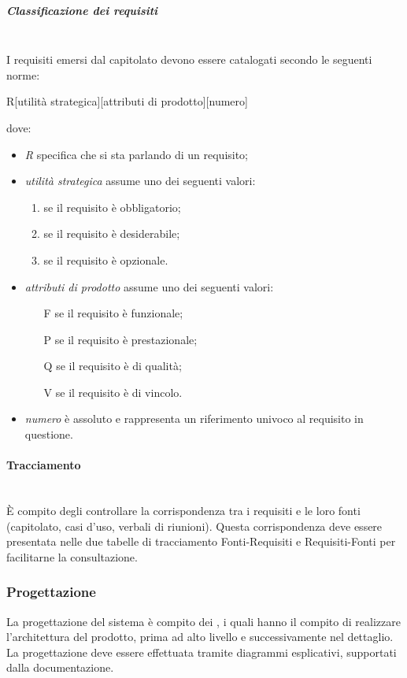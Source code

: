 \subparagraph{Classificazione dei requisiti}\mbox{}\\
I requisiti emersi dal capitolato devono essere catalogati secondo le seguenti norme:
\begin{center}
	R[utilità strategica][attributi di prodotto][numero]
\end{center}
dove:
\begin{itemize}
	\item \textit{R} specifica che si sta parlando di un requisito;
	\item \textit{utilità strategica} assume uno dei seguenti valori:
	\begin{enumerate}
		\item se il requisito è obbligatorio;
		\item se il requisito è desiderabile;
		\item se il requisito è opzionale.
	\end{enumerate}
	\item \textit{attributi di prodotto} assume uno dei seguenti valori:
	\begin{itemize}
		\item [F] se il requisito è funzionale;
		\item [P] se il requisito è prestazionale;
		\item [Q] se il requisito è di qualità;
		\item [V] se il requisito è di vincolo.
	\end{itemize}
	\item \textit{numero} è assoluto e rappresenta un riferimento univoco al requisito in questione.
\end{itemize}

\paragraph{Tracciamento}\mbox{}\\
\`{E} compito degli \Analisti{} controllare la corrispondenza tra i requisiti e le loro fonti (capitolato, casi d'uso, verbali di riunioni). Questa corrispondenza deve essere presentata nelle due tabelle di tracciamento Fonti-Requisiti e Requisiti-Fonti per facilitarne la consultazione. 

\subsubsection{Progettazione}
La progettazione del sistema è compito dei \Progettisti{}, i quali hanno il compito di realizzare l'architettura del prodotto, prima ad alto livello e successivamente nel dettaglio. La progettazione deve essere effettuata tramite diagrammi esplicativi, supportati dalla documentazione.
